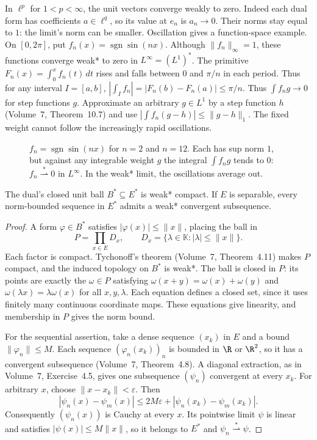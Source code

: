 In $\ell^p$ for $1<p<\infty$, the unit vectors converge weakly to zero. Indeed each dual form has coefficients $a\in\ell^q$, so its value at $e_n$ is $a_n\to0$. Their norms stay equal to $1$: the limit's norm can be smaller. Oscillation gives a function-space example. On $[0,2\pi]$, put $f_n(x)=\operatorname{sgn}\sin(nx)$. Although $\|f_n\|_\infty=1$, these functions converge weak* to zero in $L^\infty=(L^1)^*$. The primitive $F_n(x)=\int_0^xf_n(t)\,dt$ rises and falls between $0$ and $\pi/n$ in each period. Thus for any interval $I=[a,b]$, $|\int_If_n|=|F_n(b)-F_n(a)|\le\pi/n$. Thus $\int f_ng\to0$ for step functions $g$. Approximate an arbitrary $g\in L^1$ by a step function $h$ (Volume~7, Theorem~10.7) and use $|\int f_n(g-h)|\le\|g-h\|_1$. The fixed weight cannot follow the increasingly rapid oscillations.

\begin{figure}[ht]
\centering
{}
\caption{$f_n=\operatorname{sgn}\sin(nx)$ for $n=2$ and $n=12$. Each has sup norm $1$, but against any integrable weight $g$ the integral $\int f_ng$ tends to $0$: $f_n\overset*\rightharpoonup0$ in $L^\infty$. In the weak*
limit, the oscillations average out.}
\label{fig:oscillation}
\end{figure}

\begin{theorem}\label{thm:alaoglu}
The dual's closed unit ball $B^*\subseteq E^*$ is weak* compact. If $E$ is separable, every norm-bounded sequence in $E^*$ admits a weak* convergent subsequence.
\end{theorem}
\begin{proof}
A form $\varphi\in B^*$ satisfies $|\varphi(x)|\le\|x\|$, placing the ball in
\[P=\prod_{x\in E}D_x,\qquad D_x=\{\lambda\in\mathbb K:|\lambda|\le\|x\|\}.\]
Each factor is compact. Tychonoff's theorem (Volume~7, Theorem~4.11) makes $P$ compact, and the induced topology on $B^*$ is weak*. The ball is closed in $P$: its points are exactly the $\omega\in P$ satisfying $\omega(x+y)=\omega(x)+\omega(y)$ and $\omega(\lambda x)=\lambda\omega(x)$ for all $x,y,\lambda$. Each equation defines a closed set, since it uses finitely many continuous coordinate maps. These equations give linearity, and membership in $P$ gives the norm bound.

For the sequential assertion, take a dense sequence $(x_k)$ in $E$ and a bound $\|\varphi_n\|\le M$. Each sequence $(\varphi_n(x_k))_n$ is bounded in $\R$ or $\R^2$, so it has a convergent subsequence (Volume~7, Theorem~4.8). A diagonal extraction, as in Volume~7, Exercise~4.5, gives one subsequence $(\psi_n)$ convergent at every $x_k$. For arbitrary $x$, choose $\|x-x_k\|<\varepsilon$. Then
\[|\psi_n(x)-\psi_m(x)|\le2M\varepsilon+|\psi_n(x_k)-\psi_m(x_k)|.\]
Consequently $(\psi_n(x))$ is Cauchy at every $x$. Its pointwise limit $\psi$ is linear and satisfies $|\psi(x)|\le M\|x\|$, so it belongs to $E^*$ and $\psi_n\overset*\rightharpoonup\psi$.
\end{proof}

